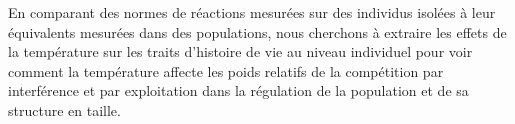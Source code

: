 En comparant des normes de réactions mesurées sur des individus isolées à leur
équivalents mesurées dans des populations, nous cherchons à extraire les effets
de la température sur les traits d'histoire de vie au niveau individuel pour
voir comment la température affecte les poids relatifs de la compétition par
interférence et par exploitation dans la régulation de la population et de sa
structure en taille. 

